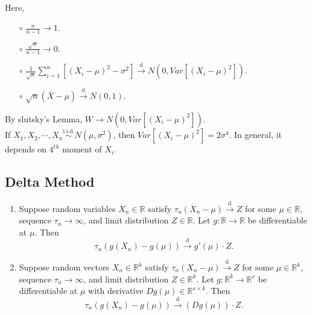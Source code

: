 \documentclass[a4paper]{article}
\begin{document}
\begin{eg}
\begin{answer}
\begin{equation}
\begin{aligned}
			\end{aligned}
		\end{equation}
	\end{answer}
	\noindent Here,
	\begin{itemize}
		\item[$\circ$] $\frac{n}{n-1} \to 1$.
		\item[$\circ$] $\frac{\sqrt{n}}{n-1} \to 0$.
		\item[$\circ$] $\frac{1}{\sqrt{n}} \sum\limits_{i=1}^n [(X_i-\mu)^2 - \sigma^2] \stackrel{\text{d}}{\longrightarrow} N(0,Var[(X_i-\mu)^2])$.
		\item[$\circ$] $\sqrt{n}(\bar{X} - \mu) \stackrel{\text{d}}{\longrightarrow} N(0,1)$.
	\end{itemize}
	By slutsky's Lemma, $W \to N(0,Var[(X_i-\mu)^2])$. \\
	\newline
	If $X_1,X_2,\cdots,X_n \stackrel{\text{i.i.d.}}{\sim} N(\mu,\sigma^2)$, then $Var[(X_i-\mu)^2] = 2 \sigma^4$. In general, it depends on $4^{th}$ moment of $X_i$.
\end{eg}

\subsection{Delta Method}

\begin{thm}
	\quad
	\begin{enumerate}
		\item Suppose random variables $X_n \in \mathbb{R}$ satisfy $\tau_n(X_n - \mu) \stackrel{\text{d}}{\longrightarrow} Z$ for some $\mu \in \mathbb{R}$, sequence $\tau_n \to \infty$, and limit distribution $Z \in \mathbb{R}$. Let $g: \mathbb{R} \to \mathbb{R}$ be differentiable at $\mu$. Then
		\begin{equation}
			\tau_n(g(X_n)-g(\mu)) \stackrel{\text{d}}{\longrightarrow} g'(\mu) \cdot Z.
		\end{equation} 
		\item Suppose random vectors $X_n \in \mathbb{R}^k$ satisfy $\tau_n(X_n - \mu) \stackrel{\text{d}}{\longrightarrow} Z$ for some $\mu \in \mathbb{R}^k$, sequence $\tau_n \to \infty$, and limit distribution $Z \in \mathbb{R}^k$. Let $g:\mathbb{R}^k \to \mathbb{R}^s$ be differentiable at $\mu$ with derivative $Dg(\mu) \in \mathbb{R}^{s \times k}$. Then
		\begin{equation}
			\tau_n(g(X_n)-g(\mu)) \stackrel{\text{d}}{\longrightarrow} (Dg(\mu)) \cdot Z.
		\end{equation}
	\end{enumerate}
\end{thm}
\end{document}
